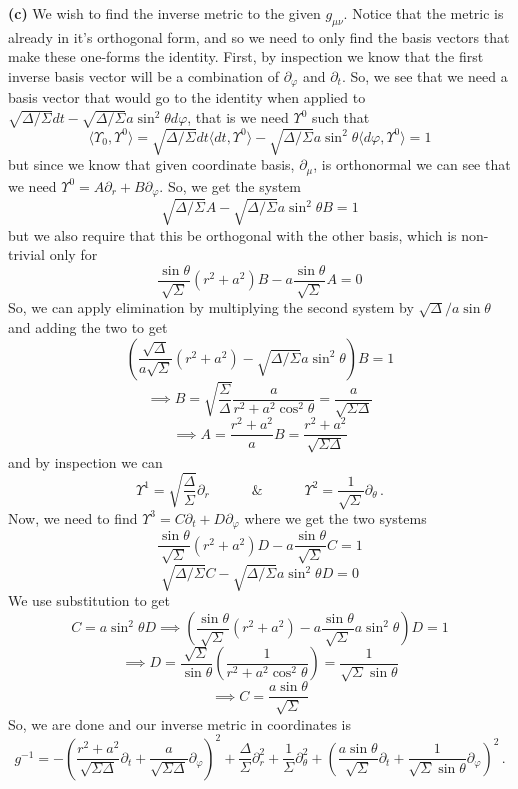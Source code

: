 \documentclass[10pt]{article}
\begin{document}
\textbf{(c)} We wish to find the inverse metric to the given $g_{\mu\nu}$. Notice that the metric is already in it's orthogonal form, and so we need to only find the basis vectors that make these one-forms the identity. First, by inspection we know that the first inverse basis vector will be a combination of $\partial_{\varphi}$ and $\partial_{t}$. So, we see that we need a basis vector that would go to the identity when applied to $\sqrt{\Delta/\Sigma}dt - \sqrt{\Delta/\Sigma}a \sin^{2}\theta d\varphi$, that is we need $\Upsilon^{0}$ such that
\[ \langle\Upsilon_{0},\Upsilon^{0}\rangle =  \sqrt{\Delta/\Sigma}dt\langle dt,\Upsilon^{0}\rangle - \sqrt{\Delta/\Sigma}a \sin^{2}\theta \langle d\varphi, \Upsilon^{0}\rangle = 1\]
but since we know that given coordinate basis, $\partial_{\mu}$, is orthonormal we can see that we need $\Upsilon^{0} = A\partial_{r} + B\partial_{\varphi}$. So, we get the system
\[ \sqrt{\Delta/\Sigma}A - \sqrt{\Delta/\Sigma}a \sin^{2}\theta B = 1 \]
but we also require that this be orthogonal with the other basis, which is non-trivial only for
\[ \frac{\sin\theta}{\sqrt{\Sigma}}(r^{2} + a^{2})B - a\frac{\sin \theta}{\sqrt{\Sigma}}A = 0 \]
So, we can apply elimination by multiplying the second system by $\sqrt{\Delta}/a\sin\theta$ and adding the two to get
\[ \left(\frac{\sqrt{\Delta}}{a\sqrt{\Sigma}}(r^{2} + a^{2}) - \sqrt{\Delta/\Sigma}a\sin^{2}\theta\right)B = 1 \]
\[ \implies B = \sqrt{\frac{\Sigma}{\Delta}}\frac{a}{r^{2} + a^{2}\cos^{2}\theta} = \frac{a}{\sqrt{\Sigma\Delta}} \]
\[\implies A = \frac{r^{2} + a^{2}}{a}B = \frac{r^{2} +a^{2}}{\sqrt{\Sigma\Delta}} \]
and by inspection we can 
\[\Upsilon^{1} = \sqrt{\frac{\Delta}{\Sigma}}\partial_{r} \hspace{3em} \& \hspace{3em} \Upsilon^{2} = \frac{1}{\sqrt{\Sigma}}\partial_{\theta} \, .\]
Now, we need to find $\Upsilon^{3} = C\partial_{t} + D\partial_{\varphi}$ where we get the two systems
\[ \frac{\sin\theta}{\sqrt{\Sigma}}(r^{2} + a^{2})D - a\frac{\sin\theta}{\sqrt{\Sigma}}C = 1\]
\[ \sqrt{\Delta/\Sigma}C - \sqrt{\Delta/\Sigma}a \sin^{2}\theta D = 0 \]
We use substitution to get
\[ C = a\sin^{2}\theta D \implies \left(\frac{\sin\theta}{\sqrt{\Sigma}}(r^{2} + a^{2}) - a\frac{\sin\theta}{\sqrt{\Sigma}}a\sin^{2}\theta\right)D = 1\]
\[ \implies D = \frac{\sqrt{\Sigma}}{\sin\theta}\left(\frac{1}{r^{2} + a^{2}\cos^{2}\theta}\right) = \frac{1}{\sqrt{\Sigma}\sin\theta}\]
\[\implies C = \frac{a\sin\theta}{\sqrt{\Sigma}} \]
So, we are done and our inverse metric in coordinates is
\[ g^{-1} = -\left(\frac{r^{2} +a^{2}}{\sqrt{\Sigma\Delta}}\partial_{t} + \frac{a}{\sqrt{\Sigma\Delta}}\partial_{\varphi}\right)^{2} + \frac{\Delta}{\Sigma}\partial_{r}^{2} + \frac{1}{\Sigma}\partial_{\theta}^{2} + \left(\frac{a\sin\theta}{\sqrt{\Sigma}}\partial_{t} + \frac{1}{\sqrt{\Sigma}\sin\theta}\partial_{\varphi}\right)^{2} \, .\]
\end{document}
